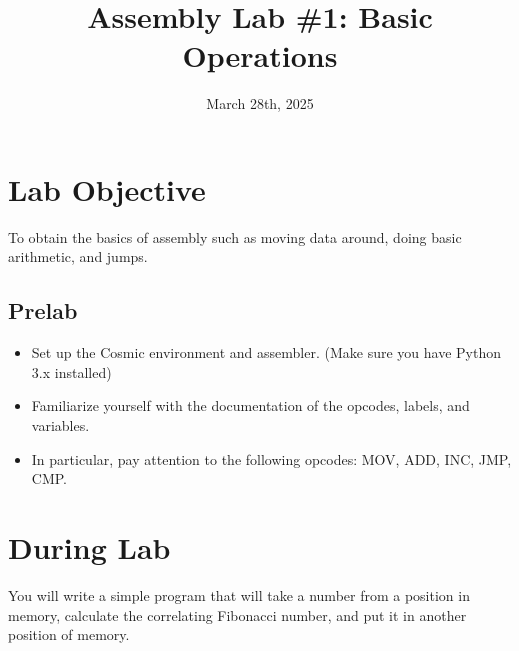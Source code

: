 \documentclass[
	12pt, %
]{fphw}
\title{Assembly Lab \#1: Basic Operations} %
\date{March 28th, 2025} %
\institute{Elizabethtown College \\ Department of Computer Science} %
\begin{document}
\maketitle %


\section*{Lab Objective}

\begin{problem}
	To obtain the basics of assembly such as moving data around, doing basic arithmetic, and jumps. 
\end{problem}


\subsection*{Prelab}

\begin{itemize}
  \item Set up the Cosmic environment and assembler. (Make sure you have Python 3.x installed)
  \item Familiarize yourself with the documentation of the opcodes, labels, and variables.
  \item In particular, pay attention to the following opcodes: MOV, ADD, INC, JMP, CMP.
\end{itemize}


\section*{During Lab}

\begin{problem}
	You will write a simple program that will take a number from a position in memory, calculate the correlating Fibonacci number, and put it in another position of memory. 
\end{problem}

\end{document}
